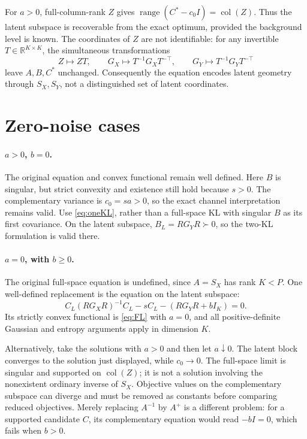 \documentclass[11pt,a4paper]{article}
\newcommand{\R}{\mathbb R}
\begin{document}
For $a>0$, full-column-rank $Z$ gives
$\operatorname{range}(C^*-c_0I)=\operatorname{col}(Z)$.
Thus the latent subspace is recoverable from the exact optimum, provided
the background level is known. The coordinates of $Z$ are not identifiable:
for any invertible $T\in\R^{K\times K}$, the simultaneous transformations
\begin{equation}
 Z\mapsto ZT,\qquad
 G_X\mapsto T^{-1}G_XT^{-\top},\qquad
 G_Y\mapsto T^{-1}G_YT^{-\top}
\end{equation}
leave $A,B,C^*$ unchanged. Consequently the equation encodes latent
geometry through $S_X,S_Y$, not a distinguished set of latent coordinates.

\section{Zero-noise cases}\label{sec:zero}
\paragraph{$a>0$, $b=0$.}
The original equation and convex functional remain well defined.
Here $B$ is singular, but strict convexity and existence still hold because
$s>0$. The complementary variance is $c_0=sa>0$, so the exact channel
interpretation remains valid. Use \eqref{eq:oneKL}, rather than a full-space
KL with singular $B$ as its first covariance. On the latent subspace,
$B_L=RG_YR\succ0$, so the two-KL formulation is valid there.

\paragraph{$a=0$, with $b\ge0$.}
The original full-space equation is undefined, since $A=S_X$ has rank $K<P$.
One well-defined replacement is the equation on the latent subspace:
\begin{equation}
 C_L(RG_XR)^{-1}C_L-sC_L-(RG_YR+bI_K)=0.
\end{equation}
Its strictly convex functional is \eqref{eq:FL} with $a=0$, and all
positive-definite Gaussian and entropy arguments apply in dimension $K$.

Alternatively, take the solutions with $a>0$ and then let $a\downarrow0$.
The latent block converges to the solution just displayed, while
$c_0\to0$. The full-space limit is singular and supported on
$\operatorname{col}(Z)$; it is not a solution involving the nonexistent
ordinary inverse of $S_X$. Objective values on the complementary subspace
can diverge and must be removed as constants before comparing reduced
objectives. Merely replacing $A^{-1}$ by $A^+$ is a different problem:
for a supported candidate $C$, its complementary equation would read
$-bI=0$, which fails when $b>0$.
\end{document}
